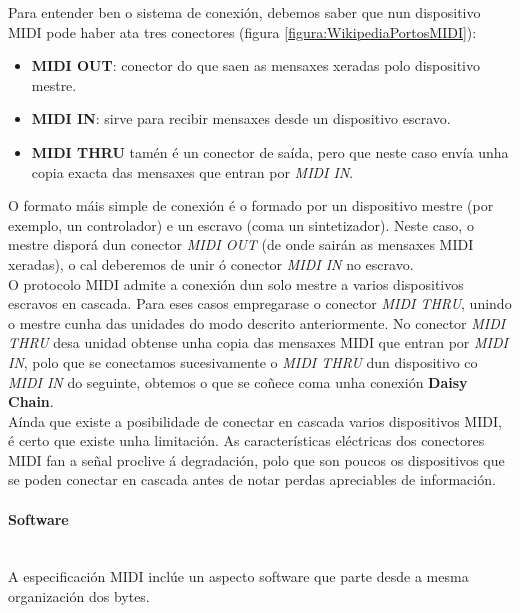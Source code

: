     Para entender ben o sistema de conexión, debemos saber que nun dispositivo
    MIDI pode haber ata tres conectores (figura
    \ref{figura:WikipediaPortosMIDI}):

    \begin{itemize}
     \item \textbf{MIDI OUT}: conector do que saen as mensaxes xeradas polo
           dispositivo mestre.
     \item \textbf{MIDI IN}: sirve para recibir mensaxes desde un dispositivo
           escravo.
     \item \textbf{MIDI THRU} tamén é un conector de saída, pero que neste caso
           envía unha copia exacta das mensaxes que entran por
           \textit{MIDI IN}.
    \end{itemize}

    O formato máis simple de conexión é o formado por un dispositivo mestre
    (por exemplo, un controlador) e un escravo (coma un sintetizador). Neste
    caso, o mestre disporá dun conector \textit{MIDI OUT} (de onde sairán as
    mensaxes MIDI xeradas), o cal deberemos de unir ó conector \textit{MIDI IN}
    no escravo. \\

    O protocolo MIDI admite a conexión dun solo mestre a varios dispositivos
    escravos en cascada. Para eses casos empregarase o conector
    \textit{MIDI THRU}, unindo o mestre cunha das unidades do modo descrito
    anteriormente. No conector \textit{MIDI THRU} desa unidad obtense unha
    copia das mensaxes MIDI que entran por \textit{MIDI IN}, polo que se
    conectamos sucesivamente o \textit{MIDI THRU} dun dispositivo co
    \textit{MIDI IN} do seguinte, obtemos o que se coñece coma unha conexión
    \textbf{Daisy Chain}. \\

    Aínda que existe a posibilidade de conectar en cascada varios dispositivos
    MIDI, é certo que existe unha limitación. As características eléctricas dos
    conectores MIDI fan a señal proclive á degradación, polo que son poucos os
    dispositivos que se poden conectar en cascada antes de notar perdas
    apreciables de información.

   \paragraph{Software}\mbox{}\\

   A especificación MIDI inclúe un aspecto software que parte desde a mesma
   organización dos bytes.

